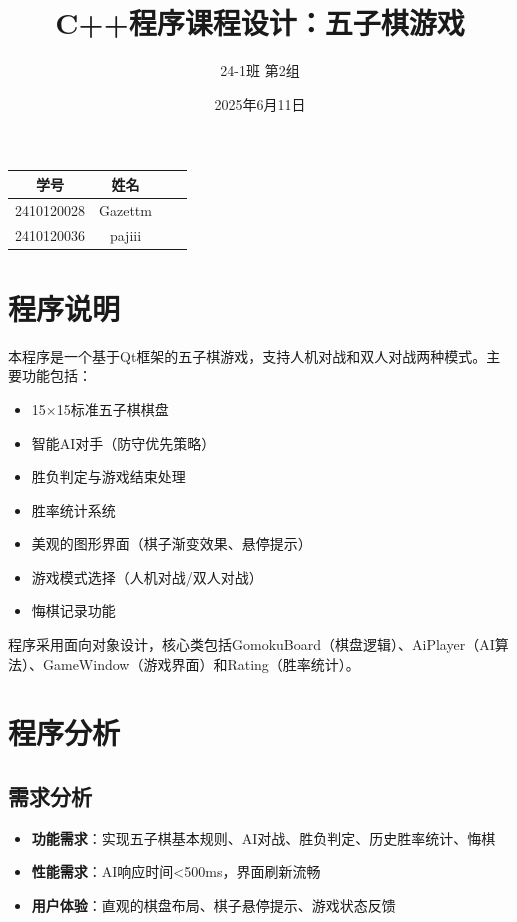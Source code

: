 \documentclass[UTF8]{ctexart}
\begin{document}
\title{C++程序课程设计：五子棋游戏}
\author{24-1班 第2组}
\date{2025年6月11日}

\maketitle
\begin{center}
    \begin{tabular}{|c|c|c|c|}
        \hline
        \textbf{学号} & \textbf{姓名}  \\
        \hline
        2410120028 & Gazettm \\
        \hline
        2410120036 & pajiii \\
        \hline
    \end{tabular}
\end{center}

\tableofcontents
\newpage

\section{程序说明}
本程序是一个基于Qt框架的五子棋游戏，支持人机对战和双人对战两种模式。主要功能包括：
\begin{itemize}
    \item 15×15标准五子棋棋盘
    \item 智能AI对手（防守优先策略）
    \item 胜负判定与游戏结束处理
    \item 胜率统计系统
    \item 美观的图形界面（棋子渐变效果、悬停提示）
    \item 游戏模式选择（人机对战/双人对战）
    \item 悔棋记录功能
\end{itemize}

程序采用面向对象设计，核心类包括GomokuBoard（棋盘逻辑）、AiPlayer（AI算法）、GameWindow（游戏界面）和Rating（胜率统计）。

\section{程序分析}
\subsection{需求分析}
\begin{itemize}
    \item \textbf{功能需求}：实现五子棋基本规则、AI对战、胜负判定、历史胜率统计、悔棋
    \item \textbf{性能需求}：AI响应时间<500ms，界面刷新流畅
    \item \textbf{用户体验}：直观的棋盘布局、棋子悬停提示、游戏状态反馈
\end{itemize}
\end{document}
